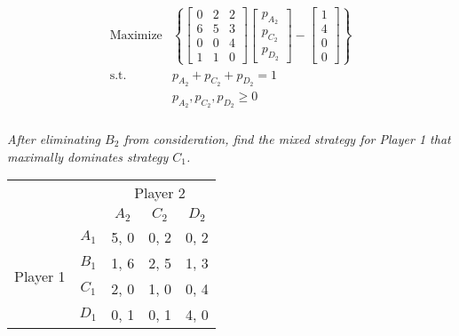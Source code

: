 \documentclass[12pt]{amsart}
\begin{document}
	\begin{align*} 
		\text{Maximize} &\left\{
		\begin{bmatrix}
			0 & 2 & 2 \\
			6 & 5 & 3 \\
			0 & 0 & 4 \\
			1 & 1 & 0 
		\end{bmatrix} 
		\begin{bmatrix}
			p_{A_2} \\ p_{C_2} \\ p_{D_2}
		\end{bmatrix} -
		\begin{bmatrix}
			1 \\ 4 \\ 0 \\ 0
		\end{bmatrix}
		\right\} \\
		\text{s.t. }\qquad 
		&p_{A_2} + p_{C_2} + p_{D_2} = 1 \\
		&p_{A_2},p_{C_2},p_{D_2} \geq 0 
	\end{align*}

	\subsubsection{}
	\textit{After eliminating $B_2$ from consideration, find the mixed strategy for Player 1 that
	maximally dominates strategy $C_1$.}
	
	\begin{center}
		\def\arraystretch{1.25}%
		\begin{tabular}{ccccc}
			&                            & \multicolumn{3}{c}{Player 2}                                                         \\
			& \multicolumn{1}{c|}{}      & \multicolumn{1}{c|}{$A_2$} & \multicolumn{1}{c|}{$C_2$} & \multicolumn{1}{c|}{$D_2$} \\ \cline{2-5} 
			\multirow{4}{*}{Player 1} & \multicolumn{1}{c|}{$A_1$} & \multicolumn{1}{c|}{5, 0}  & \multicolumn{1}{c|}{0, 2}  & \multicolumn{1}{c|}{0, 2}  \\ \cline{2-5} 
			& \multicolumn{1}{c|}{$B_1$} & \multicolumn{1}{c|}{1, 6}  & \multicolumn{1}{c|}{2, 5}  & \multicolumn{1}{c|}{1, 3}  \\ \cline{2-5} 
			& \multicolumn{1}{c|}{$C_1$} & \multicolumn{1}{c|}{2, 0}  & \multicolumn{1}{c|}{1, 0}  & \multicolumn{1}{c|}{0, 4}  \\ \cline{2-5} 
			& \multicolumn{1}{c|}{$D_1$} & \multicolumn{1}{c|}{0, 1}  & \multicolumn{1}{c|}{0, 1}  & \multicolumn{1}{c|}{4, 0}  \\ \cline{2-5} 
		\end{tabular}
	\end{center}
\end{document}
